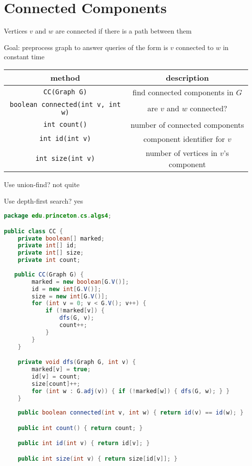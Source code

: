 \documentclass[8pt,a4paper,compress]{beamer}
\begin{document}
\section{Connected Components}
\begin{frame}[fragile]
\pause

Vertices $v$ and $w$ are connected if there is a path between them

\pause
\bigskip

Goal: preprocess graph to answer queries of the form is $v$ connected to $w$ in constant time

\begin{center}
\begin{tabular}{cc}
method & description \\ \hline
\lstinline$CC(Graph G)$ & find connected components in $G$ \\
\lstinline$boolean connected(int v, int w)$ & are $v$ and $w$ connected? \\
\lstinline$int count()$ & number of connected components \\
\lstinline$int id(int v)$ & component identifier for $v$ \\
\lstinline$int size(int v)$ & number of vertices in $v$'s component
\end{tabular} 
\end{center}

\pause
\bigskip

Use union-find? not quite

\pause
\bigskip

Use depth-first search? yes
\end{frame}

\begin{frame}[fragile]
\pause

\begin{lstlisting}[language=Java]
package edu.princeton.cs.algs4;

public class CC {
    private boolean[] marked; 
    private int[] id; 
    private int[] size;  
    private int count;  
    
   public CC(Graph G) {
        marked = new boolean[G.V()];
        id = new int[G.V()];
        size = new int[G.V()];
        for (int v = 0; v < G.V(); v++) {
            if (!marked[v]) {
                dfs(G, v);
                count++;
            }
        }
    }

    private void dfs(Graph G, int v) {
        marked[v] = true;
        id[v] = count;
        size[count]++;
        for (int w : G.adj(v)) { if (!marked[w]) { dfs(G, w); } }
    }
    
    public boolean connected(int v, int w) { return id(v) == id(w); }

    public int count() { return count; }

    public int id(int v) { return id[v]; }

    public int size(int v) { return size[id[v]]; }
\end{lstlisting} 
\end{frame}
\end{document}
